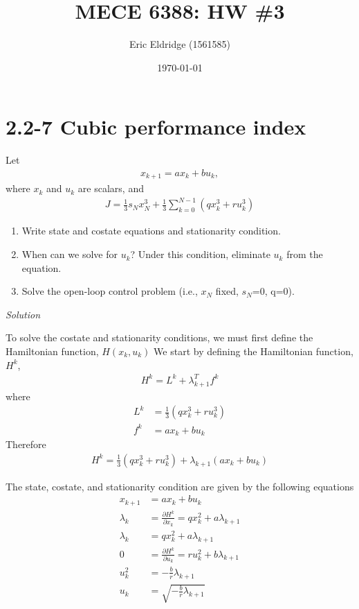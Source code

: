 \documentclass{article}
\title{MECE 6388: HW \#3}
\date{\today}
\author{Eric Eldridge (1561585)}
\begin{document}
 \maketitle

  \section{2.2-7 Cubic performance index}

  Let 
  \begin{align*}
	  x_{k+1}=ax_k+bu_k,
  \end{align*}
  where $x_k$ and $u_k$ are scalars, and 
  \begin{align*}
	  J=\frac{1}{3}s_Nx_N^3+\frac{1}{3}\sum_{k=0}^{N-1}(qx_k^3+ru_k^3)
  \end{align*}
  \begin{enumerate}[label=(\alph*)]
    \item Write state and costate equations and stationarity condition.
    \item When can we solve for $u_k$? Under this condition, eliminate $u_k$ from the equation.
    \item Solve the open-loop control problem (i.e., $x_N$ fixed, $s_N$=0, q=0).
  \end{enumerate}


  \noindent \textit{Solution} \newline \newline
  
  To solve the costate and stationarity conditions, we must first define the Hamiltonian function, $H(x_k,u_k)$
  We start by defining the Hamiltonian function, $H^k$,
  \begin{align*}
    H^k = L^k + \lambda^T_{k+1}f^k
  \end{align*}
  where 
  \begin{align*}
	  L^k &= \frac{1}{3}(qx_k^3+ru_k^3) \\
	  f^k &= ax_k+bu_k
  \end{align*}
  Therefore
  \begin{align*}
	  H^k = \frac{1}{3}(qx_k^3+ru_k^3)+\lambda_{k+1}(ax_k+bu_k)
  \end{align*}

  The state, costate, and stationarity condition are given by the following equations
  \begin{align*}
	  x_{k+1}&=ax_k+bu_k \tag{1.1} \\
	  \lambda_k&=\frac{\partial H^k}{\partial x_k}=qx_k^2+a\lambda_{k+1} \\
	  \lambda_k&=qx_k^2+a\lambda_{k+1} \tag{1.2} \\
	  0&=\frac{\partial H^k}{\partial u_k}=ru_k^2+b\lambda_{k+1} \\
	  u_k^2&=-\frac{b}{r}\lambda_{k+1} \\
	  u_k&=\sqrt{-\frac{b}{r}\lambda_{k+1}} \tag{1.3} 
  \end{align*}
\end{document}
